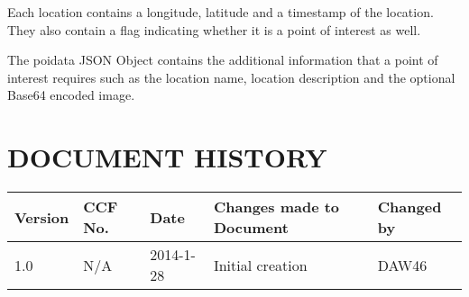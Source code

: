 \documentclass{project}
\begin{document}
Each location contains a longitude, latitude and a timestamp of the location. They also contain a flag
indicating whether it is a point of interest as well.

The poidata JSON Object contains the additional information that a point of interest requires such as the location name,
location description and the optional Base64 encoded image.





\clearpage


\section*{DOCUMENT HISTORY}
\begin{flushleft}
\begin{tabular}{ | p{1.5cm} | p{1cm} | p{2cm} | p{6cm}| p{1.5cm}| }
\hline
Version & CCF No. & Date & Changes made to Document & Changed by \\
\hline

1.0 & N/A & 2014-1-28 & Initial creation & DAW46 \\
\hline

\end{tabular}
\end{flushleft}
\label{thelastpage}
\end{document}
